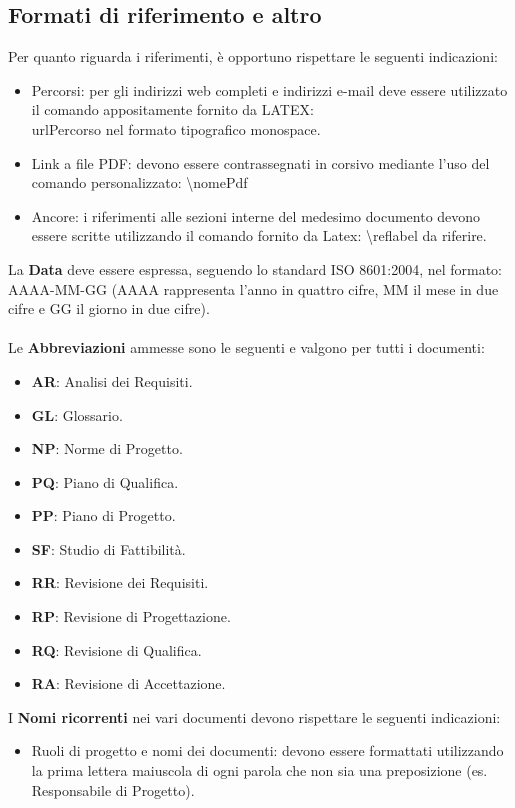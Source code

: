 {		\subsection{Formati di riferimento e altro}{
			\label{sub:rif}
			Per quanto riguarda i riferimenti, è opportuno rispettare le seguenti indicazioni:
			\begin{itemize}
				\item Percorsi: per gli indirizzi web completi e indirizzi e-mail deve essere utilizzato il comando appositamente fornito da LATEX: \\url{Percorso} nel formato tipografico monospace.
				\item Link a file PDF: devono essere contrassegnati in corsivo mediante l’uso del comando personalizzato: \textbackslash nomePdf
				\item Ancore: i riferimenti alle sezioni interne del medesimo documento devono essere scritte utilizzando il comando fornito da Latex: \textbackslash ref{label da riferire}.
			\end{itemize}
			La \textbf{Data} deve essere espressa, seguendo lo standard ISO 8601:2004, nel formato: AAAA-MM-GG (AAAA rappresenta l'anno in quattro cifre, MM il mese in due cifre e GG il giorno in due cifre).\\
			\\
			Le \textbf{Abbreviazioni} ammesse sono le seguenti e valgono per tutti i documenti:
			\begin{itemize}
				\item \textbf{AR}: Analisi dei Requisiti.
				\item \textbf{GL}: Glossario.
				\item \textbf{NP}: Norme di Progetto.
				\item \textbf{PQ}: Piano di Qualifica.
				\item \textbf{PP}: Piano di Progetto.
				\item \textbf{SF}: Studio di Fattibilità.
				\item \textbf{RR}: Revisione dei Requisiti.
				\item \textbf{RP}: Revisione di Progettazione.
				\item \textbf{RQ}: Revisione di Qualifica.
				\item \textbf{RA}: Revisione di Accettazione.
			\end{itemize}
			I \textbf{Nomi ricorrenti} nei vari documenti devono rispettare le seguenti indicazioni:
			\begin{itemize}
				\item Ruoli di progetto e nomi dei documenti: devono essere formattati utilizzando la prima lettera maiuscola di ogni parola che non sia una preposizione (es. Responsabile di Progetto).

\end{itemize}}}
